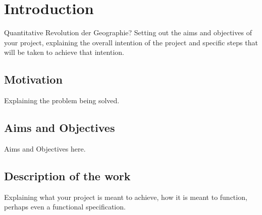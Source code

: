 \chapter{Introduction}

Quantitative Revolution der Geographie?
Setting out the aims and objectives of your project, explaining the overall intention of the project and specific steps that will be taken to achieve that intention.

\section{Motivation}

Explaining the problem being solved.


\section{Aims and Objectives}

Aims and Objectives here.


\section{Description of the work}

Explaining what your project is meant to achieve, how it is meant to function, perhaps even a functional specification.


